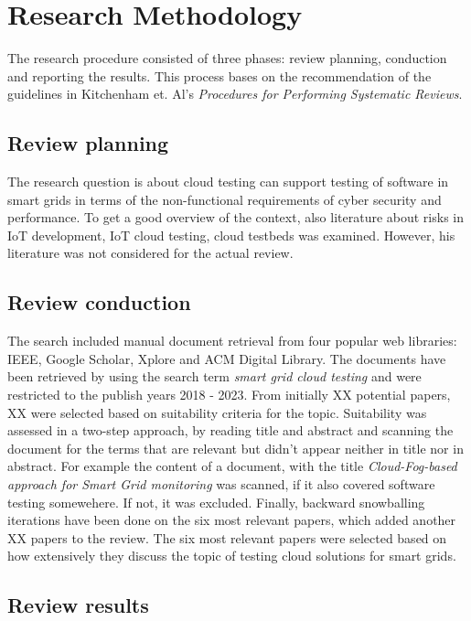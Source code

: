 \section{Research Methodology}
The research procedure consisted of three phases: review planning, conduction and reporting the results. This process bases on the recommendation of the guidelines in Kitchenham et. Al's \textit{Procedures for Performing Systematic Reviews}\cite{kitchenham2004procedures}.

\subsection{Review planning}
The research question is about cloud testing can support testing of software in smart grids in terms of the non-functional requirements of cyber security and performance. To get a good overview of the context, also literature about risks in IoT development, IoT cloud testing, cloud testbeds was examined. However, his literature was not considered for the actual review. 


\subsection{Review conduction}

The search included manual document retrieval from four popular web libraries: IEEE, Google Scholar, Xplore and ACM Digital Library. The documents have been retrieved by using the search term \textit{smart grid cloud testing} and were restricted to the publish years 2018 - 2023. From initially XX potential papers, XX were selected based on suitability criteria for the topic. Suitability was assessed in a two-step approach, by reading title and abstract and scanning the document for the terms that are relevant but didn't appear neither in title nor in abstract. For example the content of a document, with the title \textit{Cloud-Fog-based approach for Smart Grid monitoring} was scanned, if it also covered software testing somewehere. If not, it was excluded. Finally, backward snowballing iterations have been done on the six most relevant papers, which added another XX papers to the review. The six most relevant papers were selected based on how extensively they discuss the topic of testing cloud solutions for smart grids.



\subsection{Review results}

